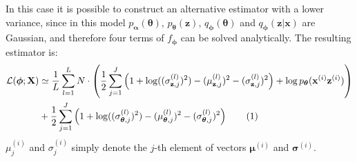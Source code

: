 \documentclass{article} %
\theoremstyle{definition}
\newcommand{\bb}[1]{\mathbf{#1}}
\newcommand{\bx}{\bb{x}}
\newcommand{\bxi}{\bx^{(i)}}
\newcommand{\bz}{\bb{z}}
\newcommand{\bzi}{\bz^{(i)}}
\newcommand{\bT}{\boldsymbol{\theta}}
\newcommand{\balpha}{\boldsymbol{\alpha}}
\newcommand{\bphi}{\boldsymbol{\phi}}
\newcommand{\bsigma}{\boldsymbol{\sigma}}
\newcommand{\bmu}{\boldsymbol{\mu}}
\newcommand{\bX}{\bb{X}}
\newcommand{\pT}{p_{\bT}}
\newcommand{\pA}{p_{\balpha}}
\newcommand{\qPhi}{q_{\bphi}}
\newcommand{\fPhi}{f_{\bphi}}
\newcommand{\eqnr}{\addtocounter{equation}{1}\tag{\theequation}}
\theoremstyle{definition}
\begin{document}
In this case it is possible to construct an alternative estimator with a lower variance, since in this model $\pA(\bT)$,  $\pT(\bz)$, $\qPhi(\bT)$ and $\qPhi(\bz|\bx)$ are Gaussian, and therefore four terms of $\fPhi$ can be solved analytically. The resulting estimator is:
\begin{align*}
\mathcal{L}(\bphi;\bX)
&\simeq 
\frac{1}{L} \sum_{l=1}^L 
N \cdot \left( \frac{1}{2} \sum_{j=1}^J \left(1 + \log ((\sigma_{\bz,j}^{(l)})^2) - (\mu_{\bz,j}^{(l)})^2 - (\sigma_{\bz,j}^{(l)})^2 \right)
+ \log \pT(\bxi\bzi) \right) \\
&+ \frac{1}{2} \sum_{j=1}^J \left(1 + \log ((\sigma_{\bT,j}^{(l)})^2) - (\mu_{\bT,j}^{(l)})^2 - (\sigma_{\bT,j}^{(l)})^2 \right)
\label{eq:gaussian_estimator_ap}\eqnr\end{align*}
$\mu_j^{(i)}$ and $\sigma_j^{(i)}$ simply denote the $j$-th element of vectors $\bmu^{(i)}$ and $\bsigma^{(i)}$.



\end{document}
